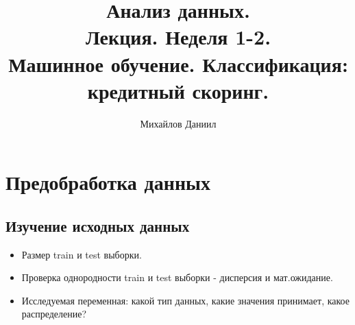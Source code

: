 \documentclass{article}
\title{Анализ данных.\\
Лекция. Неделя 1-2. \\
Машинное обучение. Классификация: кредитный скоринг.}
\author{Михайлов Даниил}
\begin{document}
\maketitle

\setcounter{tocdepth}{2} %
\renewcommand\contentsname{Содержание}
\tableofcontents
\newpage




\renewcommand{\labelitemi}{\tiny$\bullet$}
\renewcommand{\figurename}{Fig.}

 \section{Предобработка данных}
 
 \subsection{Изучение исходных данных}
 \begin{itemize}
     \item Размер train и test выборки.
     \item Проверка однородности train и test выборки - дисперсия и мат.ожидание.
     \item Исследуемая переменная: какой тип данных, какие значения принимает, какое распределение?
 \end{itemize}
 
\end{document}

